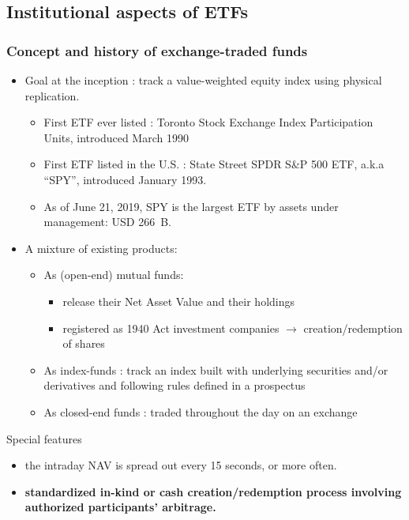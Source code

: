 \documentclass[9pt]{beamer}
\begin{document}
\subsection{Institutional aspects of ETFs}

\begin{frame}
  \frametitle{Concept and history of exchange-traded funds}
  \begin{itemize}
  \item Goal at the inception : track a value-weighted equity index using physical replication.
    \begin{itemize}
    \item First ETF ever listed : Toronto Stock Exchange Index Participation Units, introduced March 1990
    \item First ETF listed in the U.S. : State Street SPDR S\&P 500 ETF, a.k.a ``SPY'', introduced January 1993.
    \item As of June 21, 2019, SPY is the largest ETF by assets under management: USD 266~B.
    \end{itemize}
  \item A mixture of existing products:
    \begin{itemize}
    \item As (open-end) mutual funds:
      \begin{itemize}
      \item release their Net Asset Value and their holdings
      \item registered as 1940 Act investment companies $\rightarrow$ creation/redemption of shares
      \end{itemize}
    \item As index-funds : track an index built with underlying
      securities and/or derivatives and following rules defined in a
      prospectus
    \item As closed-end funds : traded throughout the day on an
      exchange
    \end{itemize}
  \end{itemize}
  \begin{alertblock}{Special features}
    \begin{itemize}
    \item the intraday NAV is spread out every 15 seconds, or more often.
    \item \textbf{standardized in-kind or cash creation/redemption process involving authorized participants' arbitrage.}
    \end{itemize}
  \end{alertblock}
\end{frame}
\end{document}
